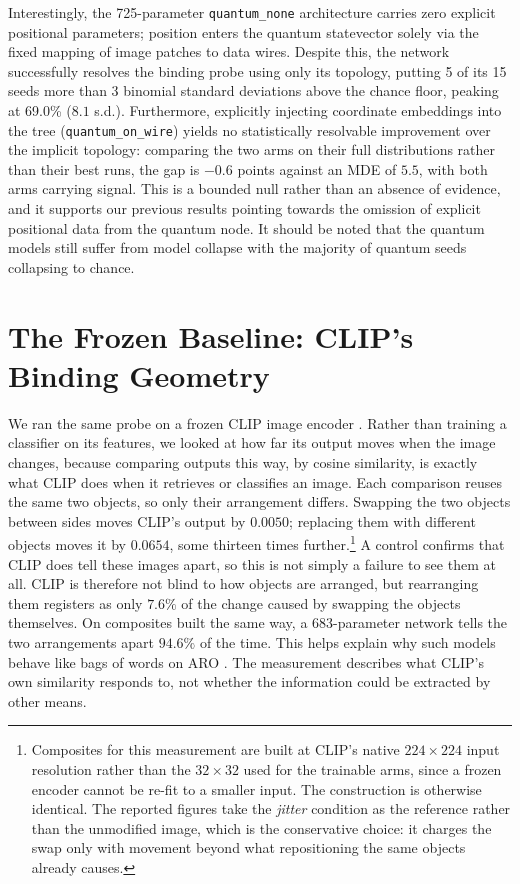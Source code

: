 \documentclass[12pt, a4paper, oneside]{report}
\begin{document}
Interestingly, the 725-parameter \texttt{quantum\_none} architecture carries zero explicit positional parameters; position enters the quantum statevector solely via the fixed mapping of image patches to data wires. Despite this, the network successfully resolves the binding probe using only its topology, putting 5 of its 15 seeds more than 3 binomial standard deviations above the chance floor, peaking at 69.0\% ($8.1$ s.d.). Furthermore, explicitly injecting coordinate embeddings into the tree (\texttt{quantum\_on\_wire}) yields no statistically resolvable improvement over the implicit topology: comparing the two arms on their full distributions rather than their best runs, the gap is $-0.6$ points against an MDE of $5.5$, with both arms carrying signal. This is a bounded null rather than an absence of evidence, and it supports our previous results pointing towards the omission of explicit positional data from the quantum node.
It should be noted that the quantum models still suffer from model collapse with the majority of quantum seeds collapsing to chance. 


\section{The Frozen Baseline: CLIP's Binding Geometry}
\label{sec:clip_geometry}

We ran the same probe on a frozen CLIP image encoder \cite{radford2021learning}.
Rather than training a classifier on its features, we looked at how far its
output moves when the image changes, because comparing outputs this way,
by cosine similarity, is exactly what CLIP does when it retrieves or
classifies an image. Each comparison reuses the same two objects, so only their
arrangement differs. Swapping the two objects between sides moves CLIP's output
by $0.0050$; replacing them with different objects moves it by $0.0654$, some
thirteen times further.\footnote{Composites for this measurement are built at
CLIP's native $224 \times 224$ input resolution rather than the $32 \times 32$
used for the trainable arms, since a frozen encoder cannot be re-fit to a
smaller input. The construction is otherwise identical. The reported figures
take the \textit{jitter} condition as the reference rather than the unmodified
image, which is the conservative choice: it charges the swap only with movement
beyond what repositioning the same objects already causes.} A control confirms
that CLIP does tell these images apart, so this is not simply a failure to see
them at all. CLIP is therefore not blind to how objects are arranged, but
rearranging them registers as only $7.6\%$ of the change caused by swapping the
objects themselves. On composites built the same way, a 683-parameter network
tells the two arrangements apart $94.6\%$ of the time. This helps explain why
such models behave like bags of words on ARO \cite{yuksekgonul2023when}. The
measurement describes what CLIP's own similarity responds to, not whether the
information could be extracted by other means.
\end{document}
